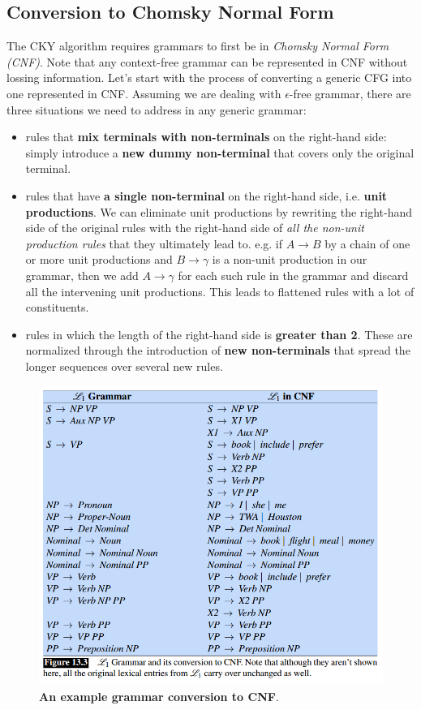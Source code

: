 \documentclass[11pt]{article}
\begin{document}
\subsection{Conversion to Chomsky Normal Form}
The CKY algorithm requires grammars to first be in \emph{Chomsky Normal Form (CNF)}. Note that any context-free grammar can be represented in CNF without lossing information. Let’s start with the process of converting a generic CFG into one represented in CNF. Assuming we are dealing with $\epsilon$-free grammar, there are three situations we need to address in any generic grammar: 
\begin{itemize}
\item rules that \textbf{mix terminals with non-terminals} on the right-hand side: simply introduce a  \textbf{new dummy non-terminal} that covers only the original terminal.
\item rules that have \textbf{a single non-terminal} on the right-hand side, i.e. \textbf{unit productions}. We can eliminate unit productions by rewriting the right-hand side of the original rules with the right-hand side of \emph{all the non-unit production rules} that they ultimately lead to. e.g. if $A \rightarrow B$ by a chain of one or more unit productions and $B \rightarrow \gamma$ is a non-unit production in our grammar, then we add $A \rightarrow \gamma$ for each such rule in the grammar and discard all the intervening unit productions. This leads to flattened rules with a lot of constituents. 
\item rules in which the length of the right-hand side is \textbf{greater than 2}. These are normalized through the introduction of \textbf{new non-terminals} that spread the longer sequences over several new rules.
\end{itemize}

\begin{figure}
\begin{minipage}[t]{1\linewidth}
  \centering
  \centerline{\includegraphics[scale = 0.5]{convert_cnf.png}}
\end{minipage}
\caption{\footnotesize{\textbf{An example grammar conversion to CNF}.}}
\label{fig: cnf_conversion}
\end{figure}
\end{document}
